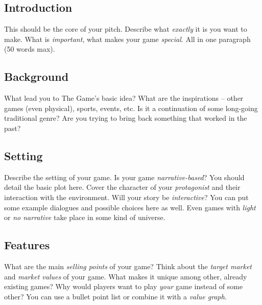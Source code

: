 \documentclass[a4paper,10pt,english]{article}
\begin{document}
\subsection*{Introduction}
This should be the core of your pitch. Describe what \emph{exactly} it is you want to make. What is \emph{important}, what makes your game \emph{special}. All in one paragraph (50 words max).

\subsection*{Background}
What lead you to The Game's basic idea? What are the inspirations -- other games (even physical), sports, events, etc. Is it a continuation of some long-going traditional genre? Are you trying to bring back something that worked in the past?

\subsection*{Setting}
Describe the setting of your game. Is your game \emph{narrative-based}? You should detail the basic plot here. Cover the character of your \emph{protagonist} and their interaction with the environment. Will your story be \emph{interactive}? You can put some example dialogues and possible choices here as well. Even games with \emph{light} or \emph{no narrative} take place in some kind of universe.

\subsection*{Features}
What are the main \emph{selling points} of your game? Think about the \emph{target market} and \emph{market values} of your game. What makes it unique among other, already existing games? Why would players want to play \emph{your} game instead of some other? You can use a bullet point list or combine it with a \emph{value graph}.
\end{document}
